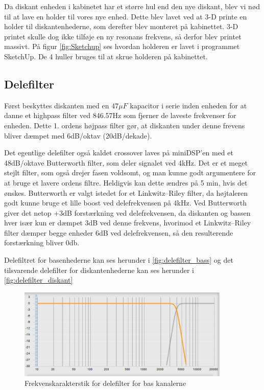 Da diskant enheden i kabinetet har et større hul end den nye diskant, blev vi nød til at lave en holder til vores nye enhed. Dette blev lavet ved at 3-D printe en holder til diskantenhederne, som derefter blev monteret på kabinettet. 3-D printet skulle dog ikke tilføje en ny resonans frekvens, så derfor blev printet massivt. På figur \ref{fig:Sketchup} ses hvordan holderen er lavet i programmet SketchUp. De 4 huller bruges til at skrue holderen på kabinettet. 

\subsection{Delefilter}
Først beskyttes diskanten med en $47\mu F$ kapacitor i serie inden enheden for at danne et highpass filter ved 846.57Hz som fjerner de laveste frekvenser for enheden. Dette 1. ordens højpass filter gør, at diskanten under denne frevens bliver dæmpet med 6dB/oktav (20dB/dekade). 

Det egentlige delefilter også kaldet crossover laves på miniDSP'en med et 48dB/oktave Butterworth filter, som deler signalet ved 4kHz. Det er et meget stejlt filter, som også drejer fasen voldsomt, og man kunne godt argumentere for at bruge et lavere ordens filtre. Heldigvis kan dette ændres på 5 min, hvis det ønskes. Butterworth er valgt istedet for et Linkwitz–Riley filter, da højtaleren godt kunne bruge et lille boost ved delefrekvensen på 4kHz. Ved Butterworth giver det netop +3dB forstærkning ved delefrekvensen, da diskanten og bassen hver især kun er dæmpet 3dB ved denne frekvens, hvorimod et Linkwitz–Riley filter dæmper begge enheder 6dB ved delefrekvensen, så den resulterende forstærkning bliver 0db.  

Delefiltret for basenhederne kan ses herunder i \autoref{fig:delefilter_bass} og det tilsvarende delefilter for diskantenhederne kan ses herunder i \autoref{fig:delefilter_diskant}
\begin{figure}[H]
	\center
	\includegraphics[width=0.9\textwidth]{figur/delefilter_bass}
	\caption{Frekvenskarakterstik for delefilter for bas kanalerne }
	\label{fig:delefilter_bass}
\end{figure}

